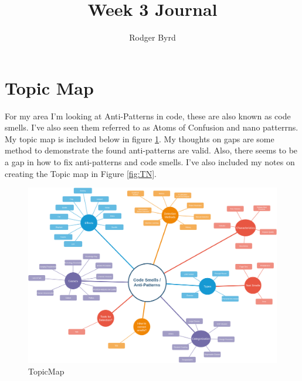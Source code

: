 \documentclass[conference]{IEEEtran}
\begin{document}

\title{Week 3 Journal}
\author{Rodger Byrd}
\maketitle


\section{Topic Map}
For my area I'm looking at Anti-Patterns in code, these are also known as code smells. I've also seen them referred to as Atoms of Confusion and nano patterrns. My topic map is included below in figure \ref{fig:TM}. My thoughts on gaps are some method to demonstrate the found anti-patterns are valid. Also, there seems to be a gap in how to fix anti-patterns and code smells. I've also included my notes on creating the Topic map in Figure \ref{fig:TN}.
\begin{figure}
  \centerline{\includegraphics[width=\textwidth]{codesmells.png}}
  \caption{TopicMap}
  \label{fig:TM}
\end{figure} 
\end{document}
